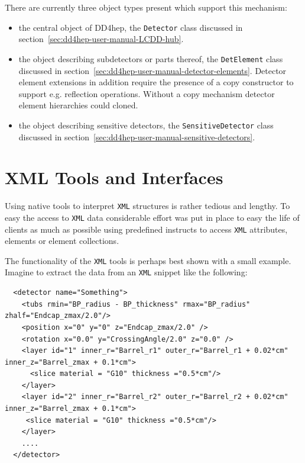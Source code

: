 There are currently three object types present which support this mechanism:
\begin{itemize}
\item the central object of DD4hep, the \texttt{Detector} class discussed in section~\ref{sec:dd4hep-user-manual-LCDD-hub}.
\item the object describing subdetectors or parts thereof, the \texttt{DetElement} class discussed in section~\ref{sec:dd4hep-user-manual-detector-elements}. Detector element extensions in addition require the presence of a copy constructor to support e.g. reflection operations. Without a copy mechanism detector element hierarchies could cloned.
\item the object describing sensitive detectors, the \texttt{SensitiveDetector} class discussed in section~\ref{sec:dd4hep-user-manual-sensitive-detectors}.
\end{itemize}

\section{XML Tools and Interfaces}
\label{sec:dd4hep-user-manual-xml-tools}

Using native tools to interpret \texttt{XML} structures is rather tedious and lengthy. To easy the access to \texttt{XML} data considerable effort was put in place to easy the life of clients as much as possible using predefined instructs to access \texttt{XML} attributes, elements or element collections.

The functionality of the \texttt{XML} tools is perhaps best shown with a small example. Imagine to extract the data from an \texttt{XML} snippet like the following:
\begin{verbatim}
  <detector name="Something">
    <tubs rmin="BP_radius - BP_thickness" rmax="BP_radius" zhalf="Endcap_zmax/2.0"/>
    <position x="0" y="0" z="Endcap_zmax/2.0" />
    <rotation x="0.0" y="CrossingAngle/2.0" z="0.0" />
    <layer id="1" inner_r="Barrel_r1" outer_r="Barrel_r1 + 0.02*cm" inner_z="Barrel_zmax + 0.1*cm">
      <slice material = "G10" thickness ="0.5*cm"/>
    </layer>
    <layer id="2" inner_r="Barrel_r2" outer_r="Barrel_r2 + 0.02*cm" inner_z="Barrel_zmax + 0.1*cm">
     <slice material = "G10" thickness ="0.5*cm"/>
    </layer>
    ....
  </detector>
\end{verbatim}

